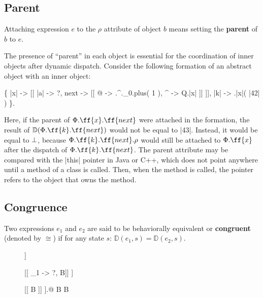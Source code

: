 \subsection{Parent}

\begin{definition}[Parent]
Attaching expression \(e\) to the \(\rho\) attribute of object \(b\)
means setting the \textbf{parent} of \(b\) to \(e\).
\end{definition}

The presence of ``parent'' in each object is essential for the coordination of inner
objects after dynamic dispatch. Consider the following formation of an abstract object
with an inner object:
\begin{phiquation*}
\Big\{ |x| -> [[ |a| -> ?, next -> [[ @ -> \xi.^.\alpha_0.plus( 1 ), ^ -> Q.|x| ]] ]], |k| -> \xi.|x|( |42| ) \Big\}.
\end{phiquation*}
Here, if the parent of \(\Phi.\ff{x}.\ff{next}\) were attached in the formation, the result of \(\mathbb{D}(\Phi.\ff{k}.\ff{next})\)
would not be equal to |43|. Instead, it would be equal to \(\bot\), because \(\Phi.\ff{k}.\ff{next}.\rho\)
would still be attached to \(\Phi.\ff{x}\) after the dispatch of \(\Phi.\ff{k}.\ff{next}\).
The parent attribute may be compared with the |this| pointer in Java or C++, which
does not point anywhere until a method of a class is called. Then, when the method
is called, the  pointer refers to the object that owns the method.

\subsection{Congruence}

\begin{definition}[Congruence]
Two expressions \(e_1\) and \(e_2\) are said to be behaviorally equivalent
or \textbf{congruent} (denoted by \(\cong\)) if for any state \(s\): \(\mathbb{D}(e_1, s) = \mathbb{D}(e_2, s)\).
\end{definition}

\begin{figure*}
\begin{mdframed}
\begin{phiquation*}
\nf \cong [[ @ -> \nf ]] \quad {}

[[ \tau_1 -> ?, B]] \cong [[ B ]] \quad {}

[[ B ]] \cong [[ B ]].@ \quad{}\;  \in B \;\; \stx{\Delta} \not\in B \quad {}
\end{phiquation*}
\end{mdframed}
\label{fig:congruence}
\end{figure*}

